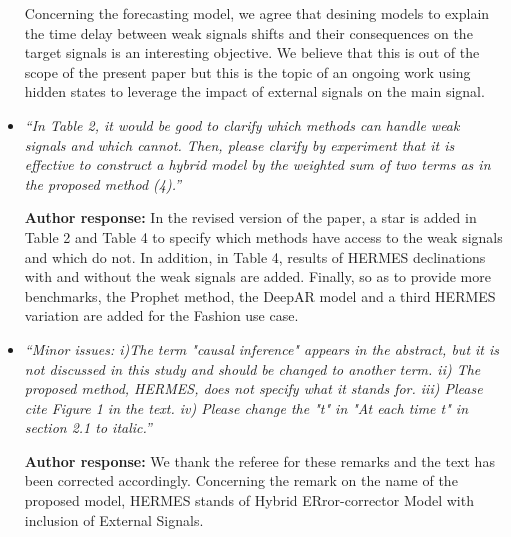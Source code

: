 \documentclass[10pt]{article} %
\begin{document}
\begin{itemize}
 Concerning the forecasting model, we agree that desining models to explain the time delay between weak signals shifts and their consequences on the target signals is an interesting objective. We believe that this is out of the scope of the present paper but this is the topic of an ongoing work using hidden states to leverage  the impact of external signals on the main signal.\	

	\item {\em ``In Table 2, it would be good to clarify which methods can handle weak signals and which cannot. Then, please clarify by experiment that it is effective to construct a hybrid model by the weighted sum of two terms as in the proposed method (4).''} \medskip

	\textbf{Author response:}  In the revised version of the paper, a star is added in Table 2 and Table 4 to specify which methods have access to the weak signals and which do not. In addition, in Table 4, results of HERMES declinations with and without the weak signals are added. Finally, so as to provide more benchmarks, the Prophet method, the DeepAR model and a third HERMES variation are added for the Fashion use case.\\
	
	\item {\em ``Minor issues: i)The term "causal inference" appears in the abstract, but it is not discussed in this study and should be changed to another term. ii) The proposed method, HERMES, does not specify what it stands for. iii) Please cite Figure 1 in the text. iv) Please change the "t" in "At each time t" in section 2.1 to italic.''} \medskip

	\textbf{Author response:} We thank the referee for these remarks and the text has been corrected accordingly. Concerning the remark on the name of the proposed model, HERMES stands of Hybrid ERror-corrector Model with inclusion of External Signals.\\	
\end{itemize}
\end{document}

